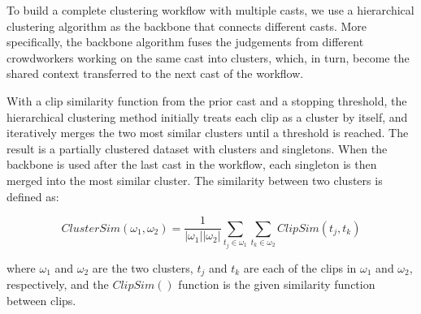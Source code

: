 
To build a complete clustering workflow with multiple casts, we use a
hierarchical clustering algorithm as the backbone that connects different
casts. More specifically, the backbone algorithm  fuses the judgements
from different crowdworkers working on the same cast into
clusters, which, in turn, become the
shared context transferred to the next cast of the workflow.

With a clip similarity function from the prior cast and a stopping threshold, 
the hierarchical clustering method initially treats each clip as a
cluster by itself, and iteratively merges the two most similar clusters until a
threshold is reached. The result is a partially clustered dataset
with clusters and singletons. 
When the backbone is used after the last cast in the workflow, each
singleton is then merged into the most similar cluster.
The similarity between two clusters is defined as:

\vspace{-2mm}
\begin{equation}
	ClusterSim(\omega_1, \omega_2) = \frac{1}{|\omega_1||\omega_2|} \sum_{t_j \in \omega_1} \sum_{t_k \in \omega_2} ClipSim(t_j, t_k)
\end{equation}
\vspace{-1mm}

where $\omega_1$ and $\omega_2$ are the two clusters, $t_j$ and $t_k$ are each of the
clips in $\omega_1$ and $\omega_2$, respectively, and the $ClipSim()$ function is
the given similarity function between clips.


